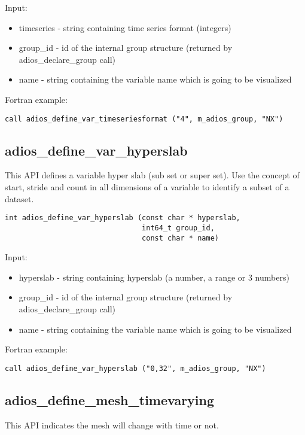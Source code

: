Input:
\begin{itemize}
\item timeseries - string containing time series format (integers)
\item group\_id - id of the internal group structure (returned by adios\_declare\_group call)
\item name - string containing the variable name which is going to be visualized
\end{itemize}

Fortran example:
\begin{lstlisting}[alsolanguage=Fortran,caption={},label={}]
call adios_define_var_timeseriesformat ("4", m_adios_group, "NX")
\end{lstlisting}


\subsection{adios\_define\_var\_hyperslab}
This API defines a variable hyper slab (sub set or super set). Use the concept of start, stride
and count in all dimensions of a variable to identify a subset of a dataset.

\begin{lstlisting}[alsolanguage=C,caption={},label={}]
int adios_define_var_hyperslab (const char * hyperslab, 
                                int64_t group_id, 
                                const char * name)
\end{lstlisting}

Input:
\begin{itemize}
\item hyperslab - string containing hyperslab (a number, a range or 3 numbers)
\item group\_id - id of the internal group structure (returned by adios\_declare\_group call)
\item name - string containing the variable name which is going to be visualized
\end{itemize}

Fortran example:
\begin{lstlisting}[alsolanguage=Fortran,caption={},label={}]
call adios_define_var_hyperslab ("0,32", m_adios_group, "NX")
\end{lstlisting}


\subsection{adios\_define\_mesh\_timevarying}
This API indicates the mesh will change with time or not.

